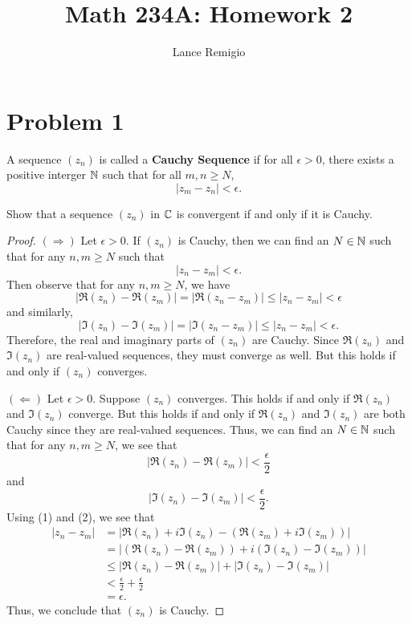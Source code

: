 \documentclass[a4paper]{article}
\title{Math 234A: Homework 2}
\author{Lance Remigio}
\begin{document}
   \maketitle 


\rhead{\thepage}


\section*{Problem 1} 
\begin{definition}
    A sequence \( ({z}_{n}) \) is called a \textbf{Cauchy Sequence} if for all \( \epsilon > 0  \), there exists a positive interger \( \mathbb{N}  \) such that for all \( m,n \geq N  \),   
    \[  | {z}_{m} - {z}_{n}  |  < \epsilon. \]
\end{definition}
Show that a sequence \( ({z}_{n}) \) in \( \mathbb{C}  \) is convergent if and only if it is Cauchy.
\begin{proof}
    \( (\Longrightarrow) \) Let \( \epsilon > 0  \). If \( ({z}_{n}) \) is Cauchy, then we can find an \( N \in \mathbb{N}  \) such that for any \( n,m \geq N  \) such that 
    \[  | {z}_{n} - {z}_{m} | < \epsilon. \]
    Then observe that for any \( n,m \geq N  \), we have
    \[ | \Re({z}_{n}) - \Re({z}_{m}) | = | \Re({z}_{n} - {z}_{m}) | \leq | {z}_{n} - {z}_{m} | < \epsilon \]
    and similarly,
    \[ | \Im({z}_{n}) - \Im({z}_{m}) | = | \Im({z}_{n} - {z}_{m}) |  \leq | {z}_{n} - {z}_{m} | < \epsilon.   \]
    Therefore, the real and imaginary parts of \( ({z}_{n}) \) are Cauchy. Since \( \Re({z}_{n}) \) and \( \Im({z}_{n}) \) are real-valued sequences, they must converge as well. But this holds if and only if \( ({z}_{n}) \) converges. 

    \( (\Longleftarrow) \) Let \( \epsilon > 0  \). Suppose \( ({z}_{n}) \) converges. This holds if and only if \( \Re({z}_{n}) \) and \( \Im({z}_{n}) \) converge. But this holds if and only if \( \Re({z}_{n}) \) and \( \Im({z}_{n}) \) are both Cauchy since they are real-valued sequences. Thus, we can find an \( N \in \mathbb{N}  \) such that for any \( n,m \geq N  \), we see that 
    \[  | \Re({z}_{n}) - \Re({z}_{m}) | < \frac{ \epsilon  }{ 2  } \tag{1}  \]
    and 
    \[  | \Im({z}_{n}) - \Im({z}_{m}) | < \frac{ \epsilon  }{  2  }. \tag{2} \]
    Using (1) and (2), we see that
    \begin{align*}
        | {z}_{n} - {z}_{m} | &= | \Re({z}_{n}) + i \Im({z}_{n}) - (\Re({z}_{m}) + i \Im({z}_{m})) |  \\
                              &= | (\Re({z}_{n}) - \Re({z}_{m})) + i (\Im({z}_{n}) - \Im({z}_{m})) | \\
                              &\leq | \Re({z}_{n}) - \Re({z}_{m}) | + | \Im({z}_{n}) - \Im({z}_{m}) | \\ 
                              &< \frac{ \epsilon  }{ 2 } + \frac{ \epsilon }{ 2 } \\
                              &= \epsilon.
    \end{align*}
    Thus, we conclude that \( ({z}_{n}) \) is Cauchy.
\end{proof}
\end{document}
